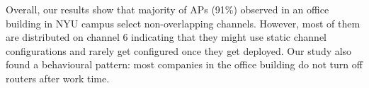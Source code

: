Overall, our results show that majority of APs (91\%) observed in an office building in NYU campus select non-overlapping channels. However, most of them are distributed on channel 6 indicating that they might use static channel configurations and rarely get configured once they get deployed. Our study also found a behavioural pattern: most companies in the office building do not turn off routers after work time.   